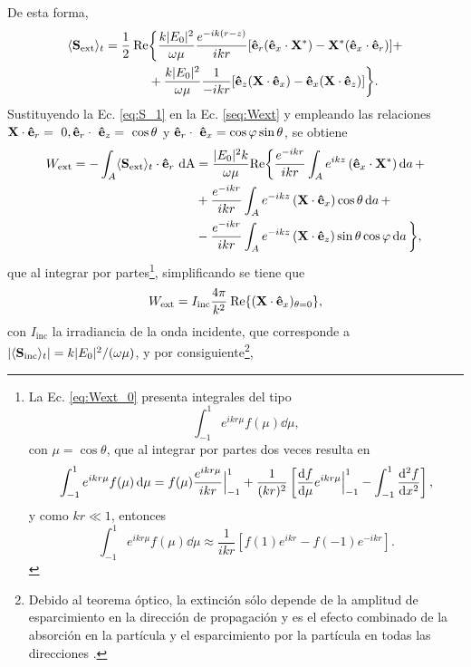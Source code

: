 %
De esta forma,
%
\begin{align}
	\langle\vb{S}_{\text{ext}}\rangle_t=\frac{1}{2}\:\mbox{Re}&\biggl\{\frac{k|E_0|^2}{\omega\mu}\frac{e^{-ik(r-z)}}{ikr}[\vu{e}_r(\vu{e}_x\cdot\vb{X}^*)-\vb{X}^*(\vu{e}_x\cdot\vu{e}_r)]+ \nonumber\\ 
	&+\frac{k|E_0|^2}{\omega\mu}\frac{1}{-ikr}[\vu{e}_z(\vb{X}\cdot\vu{e}_x)-\vu{e}_x(\vb{X}\cdot\vu{e}_z)]\biggl\}.\label{eq:S_1}
\end{align}
%
Sustituyendo la Ec. \eqref{eq:S_1} en la Ec. \eqref{seq:Wext} y empleando las relaciones $\vb{X}\cdot \vu{e}_r=~0, \vu{e}_r\cdot~\vu{e}_z=~\cos\theta$ y $\vu{e}_r\cdot~\vu{e}_x=\cos\varphi\sin\theta$, se obtiene
%
\begin{align}
		W_{\text{ext}} = -\int_{A}\langle\vb{S}_{\text{ext}}\rangle_t\cdot\vu{e}_r\text{ dA}&=\frac{|E_0|^2k}{\omega\mu}\text{Re}\biggl\{\frac{e^{-ikr}}{ikr}\int_A e^{ikz}\left(\vu{e}_x\cdot\vb{X}^*\right)\dd{a}+ \nonumber\\
		& +\frac{e^{-ikr}}{ikr}\int_A e^{-ikz}\left(\vb{X}\cdot\vu{e}_x\right)\cos\theta\dd{a}+\nonumber\\
		&-\frac{e^{-ikr}}{ikr}\int_Ae^{-ikz}\left(\vb{X}\cdot\vu{e}_z\right)\sin\theta\cos\varphi \dd{a}\biggl\}, \label{eq:Wext_0}
\end{align}
%
que al integrar por partes\footnote{La Ec. \eqref{eq:Wext_0} presenta integrales del tipo
$$\int_{-1}^{1}e^{ikr\mu}f(\mu)\dd{\mu},$$
con $\mu=\cos\theta$, que al integrar por partes dos veces resulta en \cite{bohrenAbsorptionScatteringLight2008}
$$\int_{-1}^{1}e^{ikr\mu}f(\mu)\dd{\mu}=f(\mu)\frac{e^{ikr\mu}}{ikr}\Big|_{-1}^{1}+\frac{1}{(kr)^2}\left[\dv{f}{\mu}e^{ikr\mu}\Big|_{-1}^{1}-\int_{-1}^1\dv[2]{f}{x}\right],$$
y como $kr\ll1$, entonces \cite{bohrenAbsorptionScatteringLight2008}
$$\int_{-1}^{1}e^{ikr\mu}f(\mu)\dd{\mu}\approx \frac{1}{ikr}\left[f(1)e^{ikr}-f(-1)e^{-ikr}\right].$$
}, simplificando se tiene que \cite{bohrenAbsorptionScatteringLight2008}
%
\begin{equation*}
	W_{\text{ext}}=I_{\text{inc}}\frac{4\pi}{k^2}\:\text{Re}\{(\vb{X}\cdot\vu{e}_x)_{\theta=0}\},
\end{equation*}
%
con $I_{\text{inc}}$ la irradiancia de la onda incidente, que corresponde a $|\langle\vb{S}_{\text{inc}}\rangle_t|=k|E_0|^2/(\omega\mu)$, y por consiguiente\footnote{Debido al teorema óptico, la extinción sólo depende de la amplitud de esparcimiento en la dirección de propagación y es el efecto combinado de la absorción en la partícula y el esparcimiento por la partícula en todas las direcciones \cite{bohrenAbsorptionScatteringLight2008}.},
